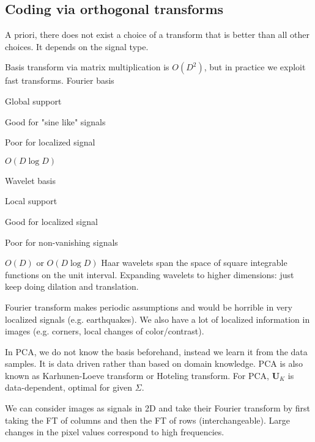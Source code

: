 \documentclass[12pt]{article}
\begin{document}
\subsection{Coding via orthogonal transforms}
\par A priori, there does not exist a choice of a transform that is better than all other choices. It depends on the signal type.
\par Basis transform via matrix multiplication is $O(D^2)$, but in practice we exploit fast transforms.
Fourier basis
\ulb
\item Global support
\item Good for "sine like" signals
\item Poor for localized signal
\item $O(D\log D)$
\ule
\par Wavelet basis
\ulb
\item Local support
\item Good for localized signal
\item Poor for non-vanishing signals
\item $O(D)$ or $O(D\log D)$
\ule
\mce
Haar wavelets span the space of square integrable functions on the unit interval. Expanding wavelets to higher dimensions: just keep doing dilation and translation.
\par Fourier transform makes periodic assumptions and would be horrible in very localized signals (e.g. earthquakes). We also have a lot of localized information in images (e.g. corners, local changes of color/contrast).
\par In PCA, we do not know the basis beforehand, instead we learn it from the data samples. It is data driven rather than based on domain knowledge. PCA is also known as Karhunen-Loeve transform or Hoteling transform. For PCA, $\mathbf{U}_K$ is data-dependent, optimal for given $\Sigma$.
\par We can consider images as signals in 2D and take their Fourier transform by first taking the FT of columns and then the FT of rows (interchangeable). Large changes in the pixel values correspond to high frequencies.
\end{document}
